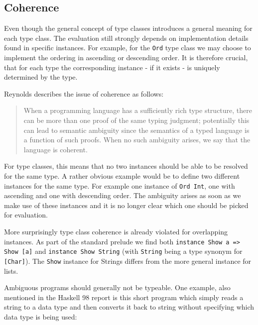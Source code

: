 \subsection{Coherence}\label{sec:coherence}

Even though the general concept of type classes introduces a general meaning for each type class.
The evaluation still strongly depends on implementation details found in specific instances.
For example, for the \texttt{Ord} type class we may choose to implement the ordering in ascending or descending order.
It is therefore crucial, that for each type the corresponding instance - if it exists - is uniquely determined by the type.

Reynolds \cite{reynolds_coherence} describes the issue of coherence as follows:

\begin{quote}
    When a programming language has a sufficiently rich type structure, there can be more than one proof of the same
    typing judgment; potentially this can lead to semantic ambiguity since the semantics of a typed language is a function
    of such proofs. When no such ambiguity arises, we say that the language is coherent.
\end{quote}

For type classes, this means that no two instances should be able to be resolved for the same type.
A rather obvious example would be to define two different instances for the same type.
For example one instance of \texttt{Ord Int}, one with ascending and one with descending order.
The ambiguity arises as soon as we make use of these instances and it is no longer clear which one should be picked for evaluation.

More surprisingly type class coherence is already violated for overlapping instances.
As part of the standard prelude we find both \texttt{instance Show a => Show [a]} and \texttt{instance Show String}
(with \texttt{String} being a type synonym for \texttt{[Char]}).
The \texttt{Show} instance for Strings differs from the more general instance for lists.

Ambiguous programs should generally not be typeable.
One example, also mentioned in the Haskell 98 report \cite{Haskell98} is this short program which simply reads a string to a data type and then converts it back to string without specifying which data type is being used:

